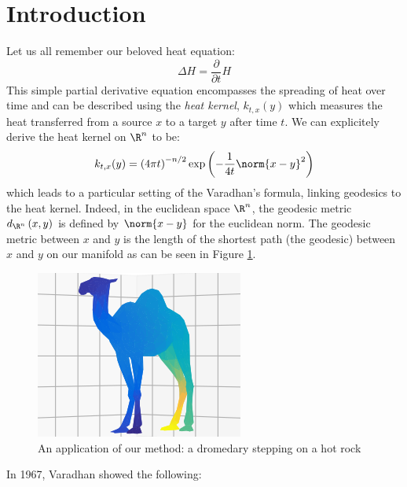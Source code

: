 \documentclass[math, info, english]{cours}
\begin{document}
\section{Introduction}
Let us all remember our beloved heat equation:
\begin{equation}
	\Delta H = \frac{\partial}{\partial t} H
\end{equation}
This simple partial derivative equation encompasses the spreading of heat over time and can be described using the \emph{heat kernel}, $k_{t, x}(y)$ which measures the heat transferred from a source $x$ to a target $y$ after time $t$.
We can explicitely derive the heat kernel on $\R^{n}$ to be:
\begin{equation}
	k_{t, x}(y) = \left( 4\pi t \right)^{-n/2}\exp\left( -\frac{1}{4t} \norm{x - y}^{2}\right)
\end{equation}
which leads to a particular setting of the Varadhan's formula, linking geodesics to the heat kernel.
Indeed, in the euclidean space $\R^{n}$, the geodesic metric $d_{\R^{n}}\left( x, y \right)$ is defined by $\norm{x - y}$ for the euclidean norm.
The geodesic metric between $x$ and $y$ is the length of the shortest path (the geodesic) between $x$ and $y$ on our manifold as can be seen in Figure \ref{camel}.
\begin{figure}[h]
	\centering
	\includegraphics[width=\textwidth]{Figures/camel_geodesics.png}
	\caption{An application of our method: a dromedary stepping on a hot rock}
	\label{camel}
\end{figure}
In 1967, Varadhan showed the following:
\end{document}
